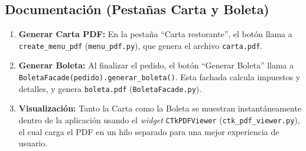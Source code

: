 \documentclass[a4paper, 12pt]{article}
\begin{document}
\subsection{Documentación (Pestañas Carta y Boleta)}
\begin{enumerate}
    \item \textbf{Generar Carta PDF:} En la pestaña ``Carta restorante'', el botón llama a \texttt{create\_menu\_pdf} (\texttt{menu\_pdf.py}), que genera el archivo \texttt{carta.pdf}.
    \item \textbf{Generar Boleta:} Al finalizar el pedido, el botón ``Generar Boleta'' llama a \texttt{BoletaFacade(pedido).generar\_boleta()}. Esta fachada calcula impuestos y detalles, y genera \texttt{boleta.pdf} (\texttt{BoletaFacade.py}).
    \item \textbf{Visualización:} Tanto la Carta como la Boleta se muestran instantáneamente dentro de la aplicación usando el \textit{widget} \texttt{CTkPDFViewer} (\texttt{ctk\_pdf\_viewer.py}), el cual carga el PDF en un hilo separado para una mejor experiencia de usuario.
\end{enumerate}
\end{document}
